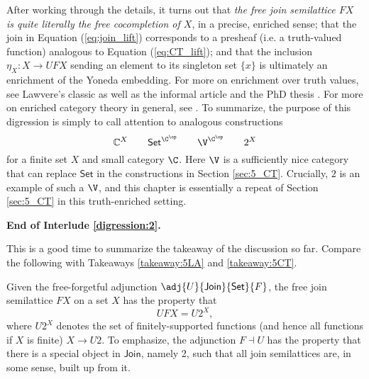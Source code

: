 After working through the details, it turns out that \textit{the free join semilattice $FX$ is quite literally the free cocompletion of $X$}, in a precise, enriched sense; that the join in Equation (\ref{eq:join_lift}) corresponds to a presheaf (i.e. a truth-valued function) analogous to Equation (\ref{eq:CT_lift}); and that the inclusion $\eta_X\colon X\to UFX$ sending an element to its singleton set $\{x\}$ is ultimately an enrichment of the Yoneda embedding. For more on enrichment over truth values, see Lawvere's classic \cite{lawvere1973} as well as the informal article \cite{willerton2014} and the PhD thesis \cite[Appendix A]{Elliott2017OnTF}. For more on enriched category theory in general, see \cite{riehl2014,kelly1982basic}. To summarize, the purpose of this digression is simply to call attention to analogous constructions
\[\mathbb{C}^X \qquad \mathsf{Set}^{\C^{\op}} \qquad \V^{\C^{\op}} \qquad 2^X\]
for a finite set $X$ and small category $\C$. Here $\V$ is a sufficiently nice category that can replace $\mathsf{Set}$ in the constructions in Section \ref{sec:5_CT}. Crucially, $2$ is an example of such a $\V$, and this chapter is essentially a repeat of Section \ref{sec:5_CT} in this truth-enriched setting.

\bigskip
\noindent\textbf{End of Interlude \ref{digression:2}.}
\bigskip

\noindent This is a good time to summarize the takeaway of the discussion so far. Compare the following with Takeaways \ref{takeaway:5LA} and \ref{takeaway:5CT}.


\begin{takeaway}\label{takeaway:5FCA} Given the free-forgetful adjunction $\adj{U}{\mathsf{Join}}{\mathsf{Set}}{F}$, the free join semilattice $FX$ on a set $X$ has the property that
  \begin{equation}\label{eq:EforFCA}
  UFX=U2^X,
  \end{equation}
where $U2^X$ denotes the set of finitely-supported functions (and hence all functions if $X$ is finite) $X\to U2$. To emphasize, the adjunction $F\dashv U$ has the property that there is a special object in $\mathsf{Join}$, namely 2, such that all join semilattices are, in some sense, built up from it.
\end{takeaway}
 
